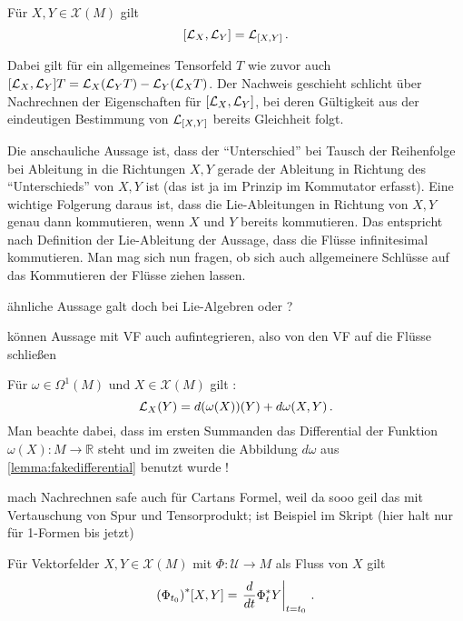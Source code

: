 \documentclass[../H_Analysis_main.tex]{subfiles}
\begin{document}
\begin{cor}
Für $X, Y \in \mathcal{X}(M)$ gilt 
\begin{equation}
\qty[\mathcal{L}_X, \mathcal{L}_Y] = \mathcal{L}_{\qty[X, Y]} \, .
\end{equation}
\end{cor}
Dabei gilt für ein allgemeines Tensorfeld $T$ wie zuvor auch $\qty[\mathcal{L}_X, \mathcal{L}_Y] T = \mathcal{L}_X \qty(\mathcal{L}_Y T) - \mathcal{L}_Y \qty(\mathcal{L}_X T)$. Der Nachweis geschieht schlicht über Nachrechnen der Eigenschaften für $\qty[\mathcal{L}_X, \mathcal{L}_Y]$, bei deren Gültigkeit aus der eindeutigen Bestimmung von $\mathcal{L}_{\qty[X, Y]}$ bereits Gleichheit folgt.

Die anschauliche Aussage ist, dass der \enquote{Unterschied} bei Tausch der Reihenfolge bei Ableitung in die Richtungen $X, Y$ gerade der Ableitung in Richtung des \enquote{Unterschieds} von $X, Y$ ist (das ist ja im Prinzip im Kommutator erfasst). Eine wichtige Folgerung daraus ist, dass die Lie-Ableitungen in Richtung von $X, Y$ genau dann kommutieren, wenn $X$ und $Y$ bereits kommutieren. Das entspricht nach Definition der Lie-Ableitung der Aussage, dass die Flüsse infinitesimal kommutieren. Man mag sich nun fragen, ob sich auch allgemeinere Schlüsse auf das Kommutieren der Flüsse ziehen lassen.


ähnliche Aussage galt doch bei Lie-Algebren oder ?

können Aussage mit VF auch aufintegrieren, also von den VF auf die Flüsse schließen

\begin{bsp}
Für $\omega \in \Omega^1(M)$ und $X \in \mathcal{X}(M)$ gilt :
\begin{equation}
\mathcal{L}_X(Y) = d\qty(\omega(X))(Y) + d\omega(X, Y) \, .
\end{equation}
Man beachte dabei, dass im ersten Summanden das Differential der Funktion $\omega(X): M \rightarrow \mathbb{R}$ steht und im zweiten die Abbildung $d\omega$ aus \ref{lemma:fakedifferential} benutzt wurde !

mach Nachrechnen safe auch für Cartans Formel, weil da sooo geil das mit Vertauschung von Spur und Tensorprodukt; ist Beispiel im Skript (hier halt nur für 1-Formen bis jetzt)
\end{bsp}

\begin{lemma}
Für Vektorfelder $X, Y \in \mathcal{X}(M)$ mit $\Phi: \mathcal{U} \rightarrow M$ als Fluss von $X$ gilt
\begin{equation}
\qty(\Phi_{t_0})^* \qty[X, Y] = \eval{\dv{t} \Phi^*_t Y}_{t = t_0} \, .
\end{equation}
\end{lemma}
\end{document}
